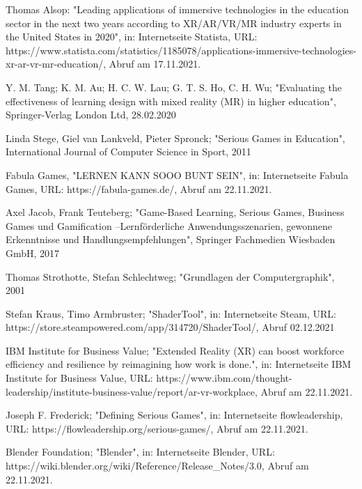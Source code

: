 \documentclass[conference]{IEEEtran}
\begin{document}
\begin{thebibliography}{00}
 Thomas Alsop: "Leading applications of immersive technologies in the education sector in the next two years according to XR/AR/VR/MR industry
experts in the United States in 2020", in: Internetseite Statista, URL: https://www.statista.com/statistics/1185078/applications-immersive-technologies-xr-ar-vr-mr-education/, Abruf am 17.11.2021.

\vskip 0.05in
 Y. M. Tang; K. M. Au; H. C. W. Lau; G. T. S. Ho, C. H. Wu; "Evaluating the effectiveness of learning design with mixed reality (MR) in higher education", Springer-Verlag London Ltd, 28.02.2020

\vskip 0.05in
 Linda Stege, Giel van Lankveld, Pieter Spronck; "Serious Games in Education", International Journal of Computer Science in Sport, 2011

\vskip 0.05in
 Fabula Games, "LERNEN KANN SOOO BUNT SEIN", in: Internetseite Fabula Games, URL: https://fabula-games.de/, Abruf am 22.11.2021.

\vskip 0.05in
 Axel Jacob, Frank Teuteberg; "Game-Based Learning, Serious Games, Business Games und Gamification –Lernförderliche Anwendungsszenarien, gewonnene Erkenntnisse und Handlungsempfehlungen", Springer Fachmedien Wiesbaden GmbH, 2017

\vskip 0.05in
 Thomas Strothotte, Stefan Schlechtweg; "Grundlagen der Computergraphik", 2001

\vskip 0.05in
 Stefan Kraus, Timo Armbruster; "ShaderTool", in: Internetseite Steam, URL: https://store.steampowered.com/app/314720/ShaderTool/, Abruf 02.12.2021

\vskip 0.05in
 IBM Institute for Business Value; "Extended Reality (XR) can boost workforce efficiency and resilience by reimagining how work is done.", in: Internetseite IBM Institute for Business Value, URL: https://www.ibm.com/thought-leadership/institute-business-value/report/ar-vr-workplace, Abruf am 22.11.2021.

\vskip 0.05in
 Joseph F. Frederick; "Defining Serious Games", in: Internetseite flowleadership, URL: https://flowleadership.org/serious-games/, Abruf am 22.11.2021.

\vskip 0.05in
 Blender Foundation; "Blender", in: Internetseite Blender, URL: https://wiki.blender.org/wiki/Reference/Release\_Notes/3.0, Abruf am 22.11.2021.


\end{thebibliography}
\end{document}
